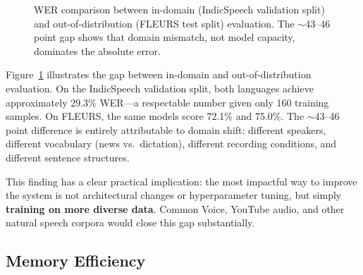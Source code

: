 \begin{figure}[t]
\centering
{}
\caption{WER comparison between in-domain (IndicSpeech validation split) and out-of-distribution (FLEURS test split) evaluation. The $\sim$43--46 point gap shows that domain mismatch, not model capacity, dominates the absolute error.}
\label{fig:ood_gap}
\end{figure}

Figure~\ref{fig:ood_gap} illustrates the gap between in-domain and out-of-distribution evaluation. On the IndicSpeech validation split, both languages achieve approximately 29.3\% WER---a respectable number given only 160 training samples. On FLEURS, the same models score 72.1\% and 75.0\%. The $\sim$43--46 point difference is entirely attributable to domain shift: different speakers, different vocabulary (news vs.\ dictation), different recording conditions, and different sentence structures.

This finding has a clear practical implication: the most impactful way to improve the system is not architectural changes or hyperparameter tuning, but simply \textbf{training on more diverse data}. Common Voice, YouTube audio, and other natural speech corpora would close this gap substantially.

\subsection{Memory Efficiency}
\label{sec:ablation_memory}

